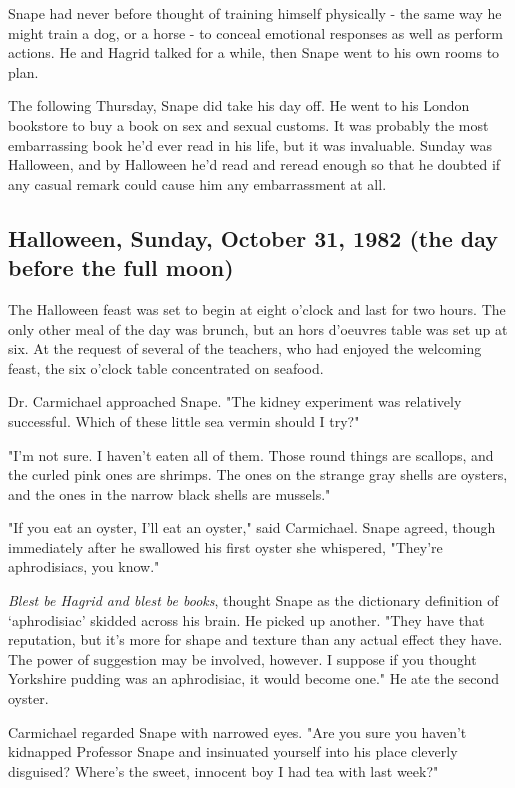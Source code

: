 Snape had never before thought of training himself physically - the same way he might train a dog, or a horse - to conceal emotional responses as well as perform actions. He and Hagrid talked for a while, then Snape went to his own rooms to plan.

The following Thursday, Snape did take his day off. He went to his London bookstore to buy a book on sex and sexual customs. It was probably the most embarrassing book he'd ever read in his life, but it was invaluable. Sunday was Halloween, and by Halloween he'd read and reread enough so that he doubted if any casual remark could cause him any embarrassment at all.

\subsection{Halloween, Sunday, October 31, 1982 (the day before the full moon)}

The Halloween feast was set to begin at eight o'clock and last for two hours. The only other meal of the day was brunch, but an hors d'oeuvres table was set up at six. At the request of several of the teachers, who had enjoyed the welcoming feast, the six o'clock table concentrated on seafood.

Dr. Carmichael approached Snape. "The kidney experiment was relatively successful. Which of these little sea vermin should I try?"

"I'm not sure. I haven't eaten all of them. Those round things are scallops, and the curled pink ones are shrimps. The ones on the strange gray shells are oysters, and the ones in the narrow black shells are mussels."

"If you eat an oyster, I'll eat an oyster," said Carmichael. Snape agreed, though immediately after he swallowed his first oyster she whispered, "They're aphrodisiacs, you know."

\emph{Blest be Hagrid and blest be books}, thought Snape as the dictionary definition of `aphrodisiac' skidded across his brain. He picked up another. "They have that reputation, but it's more for shape and texture than any actual effect they have. The power of suggestion may be involved, however. I suppose if you thought Yorkshire pudding was an aphrodisiac, it would become one." He ate the second oyster.

Carmichael regarded Snape with narrowed eyes. "Are you sure you haven't kidnapped Professor Snape and insinuated yourself into his place cleverly disguised? Where's the sweet, innocent boy I had tea with last week?"

